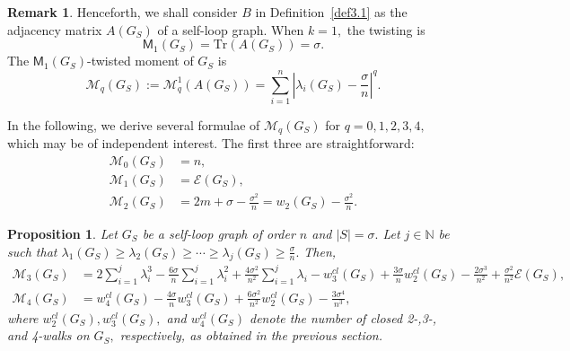 \documentclass[12pt,a4paper,reqno]{amsart}
\numberwithin{equation}{section}
\theoremstyle{plain}
\newtheorem{proposition}[theorem]{Proposition}
\theoremstyle{definition}
\newtheorem{remark}[theorem]{Remark}
\newcommand{\<}{\langle}
\renewcommand{\>}{\rangle}
\newcommand{\cE}{{\mathcal E}}
\newcommand{\cM}{{\mathcal M}}
\newcommand{\tr}{{\mathrm{Tr}}}
\newcommand{\N}{{\mathbb N}}
\begin{document}
\begin{remark}
Henceforth, we shall consider $B$ in Definition~\ref{def3.1} as the adjacency matrix $A(G_S)$ of a self-loop graph. When $k=1,$ the twisting is 
\[
\mathsf{M}_1(G_S)=\tr(A(G_S))=\sigma.
\]
The $\mathsf{M}_1(G_S)$-twisted moment of $G_S$ is
\begin{equation}
\label{eq:MqGS}
\cM_q(G_S) := \cM^1_q(A(G_S))= \sum^n_{i=1} \left|\lambda_i(G_S) - \frac{\sigma}{n} \right|^q.    
\end{equation}
\end{remark}
In the following, we derive several formulae of  $\cM_q(G_S)$ for $q=0,1,2,3,4,$ which may be of independent interest. The first three are straightforward: 
\begin{align}
    \cM_0(G_S)&=n, \label{eq:M0eq}\\
    \cM_1(G_S)&=\cE(G_S), \label{eq:M1eq}\\
    \cM_2(G_S)&= 2m + \sigma - \frac{\sigma^2}{n} 
    = w_2(G_S) - \frac{\sigma^2}{n}.
    \label{eq:M2eq}
\end{align}

\begin{proposition}
\label{M34formula}
Let $G_S$ be a self-loop graph of order $n$ and $|S|=\sigma.$ Let $j \in \N$ be such that $\lambda_1(G_S) \geq \lambda_2(G_S) \geq \cdots \geq \lambda_j(G_S) \geq \frac{\sigma}{n}.$ Then,
    \begin{align}
    \cM_3(G_S)&= 2\sum^j_{i=1} \lambda_i^3 - \frac{6\sigma}{n} \sum^j_{i=1} \lambda_i^2 + \frac{4\sigma^2}{n^2} \sum^j_{i=1} \lambda_i  - w_3^{cl}(G_S)  + \frac{3\sigma}{n} w_2^{cl}(G_S) - \frac{2\sigma^3}{n^2} + \frac{\sigma^2}{n^2} \cE(G_S), \label{eq:M3eq}\\
    \cM_4(G_S)&= w_4^{cl}(G_S) - \frac{4\sigma}{n} w_3^{cl}(G_S) + \frac{6 \sigma^2}{n^2} w_2^{cl}(G_S) - \frac{3\sigma^4}{n^3}, \label{eq:M4eq}
    \end{align}    
where $w_2^{cl}(G_S), w^{cl}_3(G_S),$ and $w_4^{cl}(G_S)$ denote the number of closed 2-,3-, and 4-walks on $G_S,$ respectively, as obtained in the previous section.
\end{proposition}

\vspace{-1em}
\end{document}
